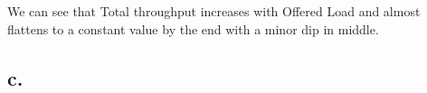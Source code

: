 \documentclass[11pt, fleqn]{article}
\begin{document}
We can see that Total throughput increases with Offered Load and almost flattens to a constant value by the end with a minor dip in middle. \\

\subsection*{c.}
\end{document}
